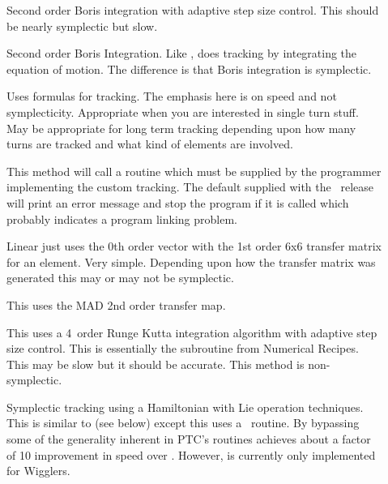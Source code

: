 \begin{description}
\item[]
Second order Boris integration\cite{b:boris} with adaptive step size control.
This should be nearly symplectic but slow.

\item[]
Second order Boris Integration. Like ,  does
tracking by integrating the equation of motion. The difference is that
Boris integration is symplectic.

\item[]
Uses formulas for tracking. The emphasis here is on speed and not
symplecticity. Appropriate when you are interested in single turn
stuff. May be appropriate for long term tracking depending upon how
many turns are tracked and what kind of elements are involved. 

\item[]
This method will call a routine  which must be
supplied by the programmer implementing the custom tracking. The
default  supplied with the \bmad\ release will print
an error message and stop the program if it is called which probably
indicates a program linking problem.

\item[]
Linear just uses the 0th order vector with the 1st order 6x6 transfer
matrix for an element. Very simple.  Depending upon how the transfer
matrix was generated this may or may not be symplectic.

\item[]
This uses the MAD 2nd order transfer map.

\item[]
This uses a 4\Th\ order Runge Kutta integration algorithm with adaptive
step size control.  This is essentially the  subroutine
from Numerical Recipes\cite{b:nr}. This may be slow but it should be
accurate. This method is non-symplectic.

\item[]
Symplectic tracking using a Hamiltonian with Lie operation techniques.
This is similar to  (see below) except this uses a
\bmad\ routine. By bypassing some of the generality inherent in PTC's routines
 achieves about a factor of 10 improvement in speed over
. However,  is
currently only implemented for Wigglers.


\end{description}
